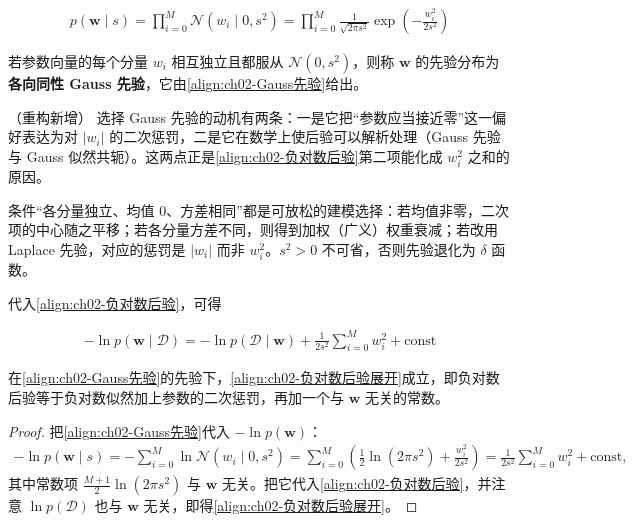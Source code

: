 \documentclass[../../main.tex]{subfiles}
\begin{document}
\begin{align}
  p(\mathbf{w}\mid s) = \prod_{i=0}^{M}\mathcal{N}(w_i\mid0,s^{2}) = \prod_{i=0}^{M}\frac{1}{\sqrt{2\pi s^{2}}}\exp\left(-\frac{w_i^{2}}{2s^{2}}\right)
  \label{align:ch02-Gauss先验}
\end{align}

\begin{definition}\label{definition:ch02-Gauss先验}
若参数向量的每个分量 $w_i$ 相互独立且都服从 $\mathcal{N}(0,s^{2})$，则称 $\mathbf{w}$ 的先验分布为\textbf{各向同性 Gauss 先验}，它由\eqref{align:ch02-Gauss先验}给出。
\end{definition}

\begin{remark}（重构新增）
选择 Gauss 先验的动机有两条：一是它把“参数应当接近零”这一偏好表达为对 $|w_i|$ 的二次惩罚，二是它在数学上使后验可以解析处理（Gauss 先验与 Gauss 似然共轭）。这两点正是\eqref{align:ch02-负对数后验}第二项能化成 $w_i^{2}$ 之和的原因。

条件“各分量独立、均值 $0$、方差相同”都是可放松的建模选择：若均值非零，二次项的中心随之平移；若各分量方差不同，则得到加权（广义）权重衰减；若改用 Laplace 先验，对应的惩罚是 $|w_i|$ 而非 $w_i^{2}$。$s^{2}>0$ 不可省，否则先验退化为 $\delta$ 函数。
\end{remark}

代入\eqref{align:ch02-负对数后验}，可得

\begin{align}
  -\ln p(\mathbf{w}\mid\mathcal{D}) = -\ln p(\mathcal{D}\mid\mathbf{w}) + \frac{1}{2s^{2}}\sum_{i=0}^{M}w_i^{2} + \text{const}
  \label{align:ch02-负对数后验展开}
\end{align}

\begin{proposition}[负对数后验的分解]\label{proposition:ch02-负对数后验分解}
在\eqref{align:ch02-Gauss先验}的先验下，\eqref{align:ch02-负对数后验展开}成立，即负对数后验等于负对数似然加上参数的二次惩罚，再加一个与 $\mathbf{w}$ 无关的常数。
\end{proposition}

\begin{proof}
把\eqref{align:ch02-Gauss先验}代入 $-\ln p(\mathbf{w})$：
\begin{align*}
  -\ln p(\mathbf{w}\mid s) = -\sum_{i=0}^{M}\ln\mathcal{N}(w_i\mid0,s^{2})
  = \sum_{i=0}^{M}\left(\frac{1}{2}\ln(2\pi s^{2}) + \frac{w_i^{2}}{2s^{2}}\right)
  = \frac{1}{2s^{2}}\sum_{i=0}^{M}w_i^{2} + \text{const} ,
\end{align*}
其中常数项 $\frac{M+1}{2}\ln(2\pi s^{2})$ 与 $\mathbf{w}$ 无关。把它代入\eqref{align:ch02-负对数后验}，并注意 $\ln p(\mathcal{D})$ 也与 $\mathbf{w}$ 无关，即得\eqref{align:ch02-负对数后验展开}。
\end{proof}
\end{document}
